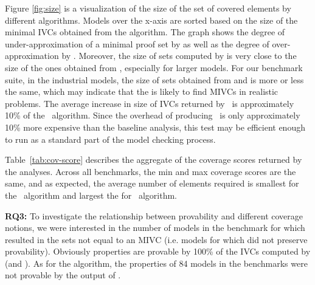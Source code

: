 Figure \ref{fig:size} is a visualization of the size of the set of covered elements by different algorithms. Models over the x-axis are sorted based on the size of the minimal IVCs obtained from the \ucbfalg
algorithm.
The graph shows the degree of under-approximation of a minimal proof set by \mustalg as well as the degree of over-approximation by \ucalg.
Moreover, the size of sets computed by \ucalg is very close to the size
of the ones obtained from \ucbfalg, especially for larger models.  For our benchmark suite, in the industrial models, the size of sets obtained from \ucbfalg and \ucalg is more or less the same, which may indicate that the \ucalg is likely to find MIVCs in realistic problems.  The average increase in size of IVCs returned by \ucalg\ is approximately 10\% of the \ucbfalg\ algorithm.  Since the overhead of producing \ucalg\ is only approximately 10\% more expensive than the baseline analysis, this test may be efficient enough to run as a standard part of the model checking process.  %




Table~\ref{tab:cov-score} describes the aggregate of the coverage scores returned by the analyses.  Across all benchmarks, the min and max coverage scores are the same, and as expected, the average number of elements required is smallest for the \mustalg\ algorithm and largest the for \ucalg\ algorithm.



\textbf{RQ3:}
To investigate the relationship between provability and different coverage notions,
we were interested in the number of models in the benchmark for which
\mustalg resulted in the sets not equal to an MIVC (i.e. models for which
\mustalg did not preserve provability).
Obviously properties are provable by 100\% of the IVCs computed by \ucalg (and \ucbfalg).
As for the \mustalg algorithm, the properties of 84 models in the benchmarks were not provable by the output of \mustalg.



